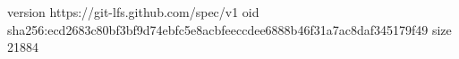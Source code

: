 version https://git-lfs.github.com/spec/v1
oid sha256:ecd2683c80bf3bf9d74ebfc5e8acbfeeccdee6888b46f31a7ac8daf345179f49
size 21884
